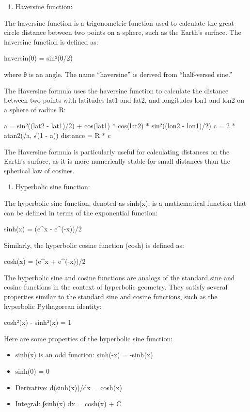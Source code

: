 \documentclass[
]{article}
\providecommand{\tightlist}{%
  \setlength{\itemsep}{0pt}\setlength{\parskip}{0pt}}
\begin{document}
\begin{enumerate}
\def\labelenumi{\arabic{enumi}.}
\tightlist
\item
  Haversine function:
\end{enumerate}

The haversine function is a trigonometric function used to calculate the
great-circle distance between two points on a sphere, such as the
Earth's surface. The haversine function is defined as:

haversin(θ) = sin²(θ/2)

where θ is an angle. The name ``haversine'' is derived from
``half-versed sine.''

The Haversine formula uses the haversine function to calculate the
distance between two points with latitudes lat1 and lat2, and longitudes
lon1 and lon2 on a sphere of radius R:

a = sin²((lat2 - lat1)/2) + cos(lat1) * cos(lat2) * sin²((lon2 -
lon1)/2) c = 2 * atan2(√a, √(1 - a)) distance = R * c

The Haversine formula is particularly useful for calculating distances
on the Earth's surface, as it is more numerically stable for small
distances than the spherical law of cosines.

\begin{enumerate}
\def\labelenumi{\arabic{enumi}.}
\setcounter{enumi}{1}
\tightlist
\item
  Hyperbolic sine function:
\end{enumerate}

The hyperbolic sine function, denoted as sinh(x), is a mathematical
function that can be defined in terms of the exponential function:

sinh(x) = (e\^{}x - e\^{}(-x))/2

Similarly, the hyperbolic cosine function (cosh) is defined as:

cosh(x) = (e\^{}x + e\^{}(-x))/2

The hyperbolic sine and cosine functions are analogs of the standard
sine and cosine functions in the context of hyperbolic geometry. They
satisfy several properties similar to the standard sine and cosine
functions, such as the hyperbolic Pythagorean identity:

cosh²(x) - sinh²(x) = 1

Here are some properties of the hyperbolic sine function:

\begin{itemize}
\tightlist
\item
  sinh(x) is an odd function: sinh(-x) = -sinh(x)
\item
  sinh(0) = 0
\item
  Derivative: d(sinh(x))/dx = cosh(x)
\item
  Integral: ∫sinh(x) dx = cosh(x) + C
\end{itemize}
\end{document}
